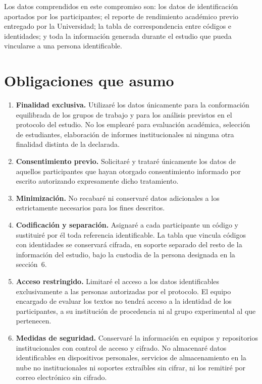 \documentclass[10.5pt,a4paper]{article}
\begin{document}
Los datos comprendidos en este compromiso son: los datos de identificaci\'on aportados por los participantes; el reporte de rendimiento acad\'emico previo entregado por la Universidad; la tabla de correspondencia entre c\'odigos e identidades; y toda la informaci\'on generada durante el estudio que pueda vincularse a una persona identificable.

\section{Obligaciones que asumo}

\begin{enumerate}[label=\textbf{\arabic*.},leftmargin=0.9cm]
	\item \textbf{Finalidad exclusiva.} Utilizar\'e los datos \'unicamente para la conformaci\'on equilibrada de los grupos de trabajo y para los an\'alisis previstos en el protocolo del estudio. No los emplear\'e para evaluaci\'on acad\'emica, selecci\'on de estudiantes, elaboraci\'on de informes institucionales ni ninguna otra finalidad distinta de la declarada.
	\item \textbf{Consentimiento previo.} Solicitar\'e y tratar\'e \'unicamente los datos de aquellos participantes que hayan otorgado consentimiento informado por escrito autorizando expresamente dicho tratamiento.
	\item \textbf{Minimizaci\'on.} No recabar\'e ni conservar\'e datos adicionales a los estrictamente necesarios para los fines descritos.
	\item \textbf{Codificaci\'on y separaci\'on.} Asignar\'e a cada participante un c\'odigo y sustituir\'e por \'el toda referencia identificable. La tabla que vincula c\'odigos con identidades se conservar\'a cifrada, en soporte separado del resto de la informaci\'on del estudio, bajo la custodia de la persona designada en la secci\'on~6.
	\item \textbf{Acceso restringido.} Limitar\'e el acceso a los datos identificables exclusivamente a las personas autorizadas por el protocolo. El equipo encargado de evaluar los textos no tendr\'a acceso a la identidad de los participantes, a su instituci\'on de procedencia ni al grupo experimental al que pertenecen.
	\item \textbf{Medidas de seguridad.} Conservar\'e la informaci\'on en equipos y repositorios institucionales con control de acceso y cifrado. No almacenar\'e datos identificables en dispositivos personales, servicios de almacenamiento en la nube no institucionales ni soportes extra\'ibles sin cifrar, ni los remitir\'e por correo electr\'onico sin cifrado.

\end{enumerate}
\end{document}

